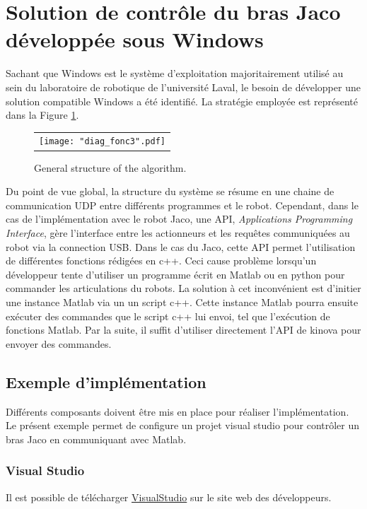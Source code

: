 \section{Solution de contrôle du bras Jaco développée sous Windows}

Sachant que Windows est le système d'exploitation majoritairement utilisé au sein du laboratoire de robotique de l'université Laval, le besoin de développer une solution compatible Windows a été identifié. 
La stratégie employée est représenté dans la Figure \ref{fig:diag}.
\begin{figure}
 \begin{center}
  \begin{tabular}{c}
    \texttt{[image: "diag\_fonc3".pdf]}
  \end{tabular}
 \end{center}
\caption{General structure of the algorithm.}
 \label{fig:diag}
\end{figure}
Du point de vue global, la structure du système se résume en une chaine de communication UDP entre différents programmes et le robot. 
Cependant, dans le cas de l'implémentation avec le robot Jaco, une API, \textit{Applications Programming Interface}, gère l'interface entre les actionneurs et les requêtes communiquées au robot via la connection USB.
Dans le cas du Jaco, cette API permet l'utilisation de différentes fonctions rédigées en c++.
Ceci cause problème lorsqu'un développeur tente d'utiliser un programme écrit en Matlab ou en python pour commander les articulations du robots.
La solution à cet inconvénient est d'initier une instance Matlab via un un script c++.
Cette instance Matlab pourra ensuite exécuter des commandes que le script c++ lui envoi, tel que l’exécution de fonctions Matlab.
Par la suite, il suffit d'utiliser directement l'API de kinova pour envoyer des commandes.

\subsection{Exemple d'implémentation}

Différents composants doivent être mis en place pour réaliser l'implémentation.
Le présent exemple permet de configure un projet visual studio pour contrôler un bras Jaco en communiquant avec Matlab.
\subsubsection{Visual Studio}
Il est possible de télécharger \href{https://www.visualstudio.com/thank-you-downloading-visual-studio/?sku=Community&rel=15}{VisualStudio} sur le site web des développeurs.

